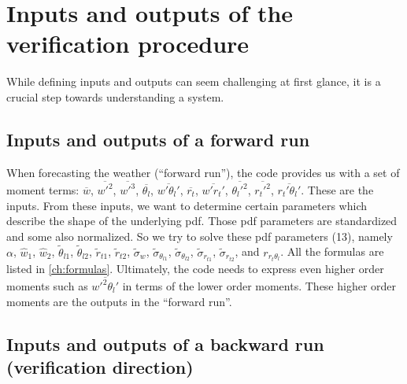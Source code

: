 \section{Inputs and outputs of the verification procedure}
\label{sec:inputs-and-outputs-of-the-verification-procedure}

While defining inputs and outputs can seem challenging at first glance,
it is a crucial step towards understanding a system.

\subsection{Inputs and outputs of a forward run}
\label{subsec:inputs-and-outputs-of-a-forward-run}

When forecasting the weather (\enquote{forward run}),
the code provides us with a set of moment terms:
$\overline{w}$, $\overline{w'^2}$, $\overline{w'^3}$, $\overline{\theta_l}$, $\overline{w'\theta_l'}$,
$\overline{r_t}$, $\overline{w' r_t'}$, $\overline{\theta_l'^2}$, $\overline{r_t'^2}$, $\overline{r_t'\theta_l'}$.
These are the inputs.
From these inputs,
we want to determine certain parameters which describe the shape of the underlying \gls{pdf}.
Those \gls{pdf} parameters are standardized and some also normalized.
So we try to solve these \gls{pdf} parameters (13),
namely $\alpha$, $\widehat{w}_1$, $\widehat{w}_2$, $\tilde{\theta}_{l1}$, $\tilde{\theta}_{l2}$, $\tilde{r}_{t1}$,
$\tilde{r}_{t2}$, $\tilde{\sigma}_w$, $\tilde{\sigma}_{\theta_{l1}}$, $\tilde{\sigma}_{\theta_{l2}}$,
$\tilde{\sigma}_{r_{t1}}$, $\tilde{\sigma}_{r_{t2}}$, and $r_{r_t \theta_l}$.
All the formulas are listed in \cref{ch:formulas}.
Ultimately, the code needs to express even higher order moments such as $\overline{w'^2 \theta_l'}$
in terms of the lower order moments.
These higher order moments are the outputs in the \enquote{forward run}.

\subsection{Inputs and outputs of a backward run (verification direction)}
\label{subsec:inputs-and-outputs-of-a-backward-run-(verification-direction)}

